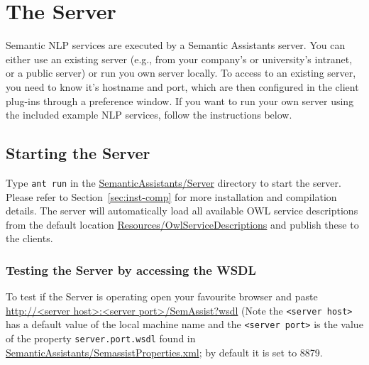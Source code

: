 
\chapter{The \sa Server}
\label{chap:serv}
Semantic NLP services are executed by a Semantic Assistants
server. You can either use an existing server (e.g., from your
company's or university's intranet, or a public server) or run you own
server locally. To access to an existing server, you need to know it's
hostname and port, which are then configured in the client plug-ins
through a preference window.  If you want to run your own server using
the included example NLP services, follow the instructions below.

\section{Starting the Server}
Type \texttt{ant run} in the \url{SemanticAssistants/Server} directory
to start the server. Please refer to Section~\ref{sec:inst-comp} for
more installation and compilation details. The server will
automatically load all available OWL service descriptions from the
default location \url{Resources/OwlServiceDescriptions} and publish
these to the clients.

\subsection{Testing the Server by accessing the WSDL}
To test if the Server is operating open your favourite browser and
paste \url{http://<server host>:<server port>/SemAssist?wsdl} (Note
the \texttt{<server host>} has a default value of the local machine
name and the \texttt{<server port>} is the value of the property
\texttt{server.port.wsdl} found in
\url{SemanticAssistants/SemassistProperties.xml}; by default it is set
to 8879.

